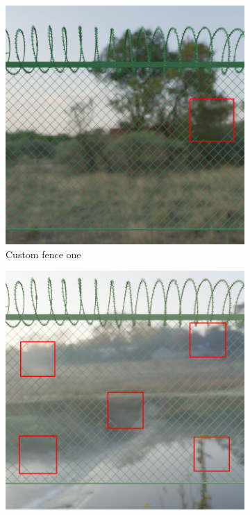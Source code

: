 \documentclass[../Head/Main.tex]{subfiles}
\begin{document}
\begin{figure}[H]
    \centering
    \begin{subfigure}{.3\textwidth}
        \centering
        \includegraphics[width=\textwidth]{../Figures/augmentations/img_bb30.png}
        \caption{Custom fence one}
        \label{fig:custom_fence_one}
    \end{subfigure}
    \hfill
    \begin{subfigure}{.3\textwidth}
        \centering
        \includegraphics[width=\textwidth]{../Figures/augmentations/img_bb60.png}

\end{subfigure}
\end{figure}
\end{document}
